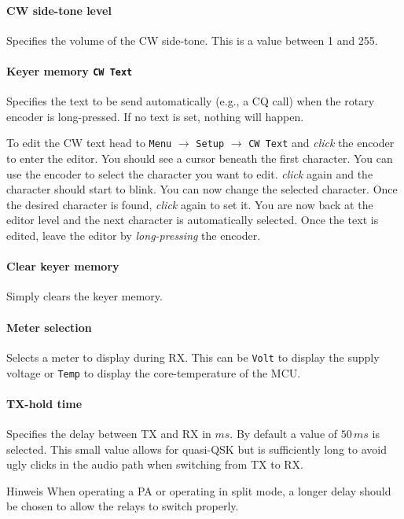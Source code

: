 \documentclass[10pt, a4paper,twoside]{scrartcl}
\newenvironment{remark}{\begin{bclogo}[couleur=blue!30,arrondi=.1,logo=\bcinfo,ombre=true]{Hinweis}}{\end{bclogo}}
\begin{document}
\paragraph{CW side-tone level}
Specifies the volume of the CW side-tone. This is a value between 1 and 255.

\paragraph{Keyer memory \texttt{CW Text}}
Specifies the text to be send automatically (e.g., a CQ call) when the rotary encoder is long-pressed. If no text is set, nothing will happen.

To edit the CW text head to \texttt{Menu} $\rightarrow$ \texttt{Setup} $\rightarrow$ \texttt{CW Text} and \emph{click} the encoder to enter the editor. You should see a cursor beneath the first character. You can use the encoder to select the character you want to edit. \emph{click} again and the character should start to blink. You can now change the selected character. Once the desired character is found, \emph{click} again to set it. You are now back at the editor level and the next character is automatically selected. Once the text is edited, leave the editor by \emph{long-pressing} the encoder.

\paragraph{Clear keyer memory}
Simply clears the keyer memory.

\paragraph{Meter selection}
Selects a meter to display during RX. This can be \texttt{Volt} to display the supply voltage or \texttt{Temp} to display the core-temperature of the MCU.

\paragraph{TX-hold time}
Specifies the delay between TX and RX in $ms$. By default a value of $50\,ms$ is selected. This small value allows for quasi-QSK but is sufficiently long to avoid ugly clicks in the audio path when switching from TX to RX.
\begin{remark}
When operating a PA or operating in split mode, a longer delay should be chosen to allow the relays to switch properly.
\end{remark}
\end{document}
